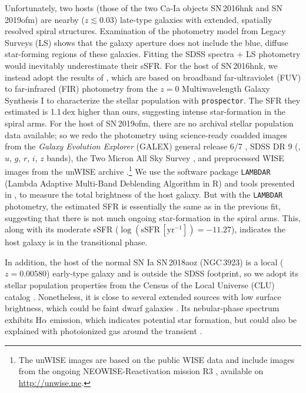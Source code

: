 \documentclass[twocolumn]{aastex631}
\begin{document}
Unfortunately, two hosts (those of the two Ca-Ia objects SN\,2016hnk and SN\,2019ofm) are nearby ($z \lesssim 0.03$) late-type galaxies with extended, spatially resolved spiral structures. Examination of the photometry model from Legacy Surveys (LS) shows that the galaxy aperture does not include the blue, diffuse star-forming regions of these galaxies. Fitting the SDSS spectra + LS photometry would inevitably underestimate their sSFR. For the host of SN\,2016hnk, we instead adopt the results of \citet{Dong_Ca-rich_2022}, which are based on broadband far-ultraviolet (FUV) to far-infrared (FIR) photometry from the $z=0$ Multiwavelength Galaxy Synthesis I \citep[z0MGS;][]{Leroy_2019} to characterize the stellar population with \texttt{prospector}. The SFR they estimated is 1.1\,dex higher than ours, suggesting intense star-formation in the spiral arms.
For the host of SN\,2019ofm, there are no archival stellar population data available; so we redo the photometry using science-ready coadded images from the \textit{Galaxy Evolution Explorer} (GALEX) general release 6/7 \citep[][$FUV$ and $NUV$ bands]{Martin2005a}, SDSS DR 9 (\citealp{Ahn2012a}, $u$, $g$, $r$, $i$, $z$ bands), the Two Micron All Sky Survey \citep[2MASS;][$H$ and $J$ bands]{Skrutskie2006a}, and preprocessed WISE images \citep{Wright2010a} from the unWISE archive \citep[][$W_1$ and $W_2$ bands]{Lang2014a}.\footnote{The unWISE images are based on the public WISE data and include images from the ongoing NEOWISE-Reactivation mission R3 \citep{Mainzer2014a, Meisner2017a}, available on \href{http://unwise.me}{http://unwise.me}.} We use the software package \texttt{LAMBDAR} (Lambda Adaptive Multi-Band Deblending Algorithm in R) \citep{Wright2016a} and tools presented in \citet{Schulze2021a}, to measure the total brightness of the host galaxy. But with the \texttt{LAMBDAR} photometry, the estimated SFR is essentially the same as in the previous fit, suggesting that there is not much ongoing star-formation in the spiral arms. This, along with its moderate sSFR ($\log (\mathrm{sSFR}\,[\mathrm{yr}^{-1}])=-11.27$), indicates the host galaxy is in the transitional phase.

In addition, the host of the normal SN Ia SN\,2018aoz (NGC\,3923) is a local ($z=0.00580$) early-type galaxy and is outside the SDSS footprint, so we adopt its stellar population properties from the Census of the Local Universe (CLU) catalog \citep{Cook_2019, de_Ca_rich_2020}. %
Nonetheless, it is close to several extended sources with low surface brightness, which could be faint dwarf galaxies \citep[see Figure~3 in][]{Kasliwal_2012}. Its nebular-phase spectrum exhibits H$\alpha$ emission, which indicates potential star formation, but could also be explained with photoionized gas around the transient \citep{Kasliwal_2012}.
\end{document}
